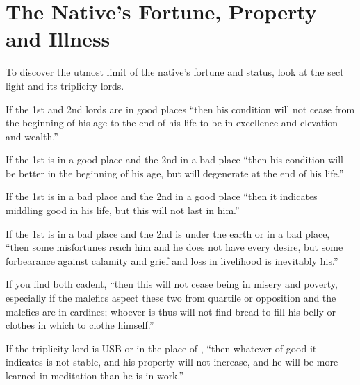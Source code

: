 \section{The Native's Fortune, Property and Illness}
To discover the utmost limit of the native's fortune and status, look at the sect light and its triplicity lords.

If the 1st and 2nd lords are in good places ``then his condition will not cease from the beginning of his age to the end of his life to be in excellence and elevation and wealth.''

If the 1st is in a good place and the 2nd in a bad place ``then his condition will be better in the beginning of his age, but will degenerate at the end of his life.''

If the 1st is in a bad place and the 2nd in a good place ``then it indicates middling good in his life, but this will not last in him.''

If the 1st is in a bad place and the 2nd is under the earth or in a bad place, ``then some misfortunes reach him and he does not have every desire, but some forbearance against calamity and grief and loss in livelihood is inevitably his.''

If you find both cadent, ``then this will not cease being in misery and poverty, especially if the malefics aspect these two from quartile or opposition and the malefics are in cardines; whoever is thus will not find bread to fill his belly or clothes in which to clothe himself.''

If the triplicity lord is USB or in the place of \Saturn, ``then whatever of good it indicates is not stable, and his property will not increase, and he will be more learned in meditation than he is in work.''